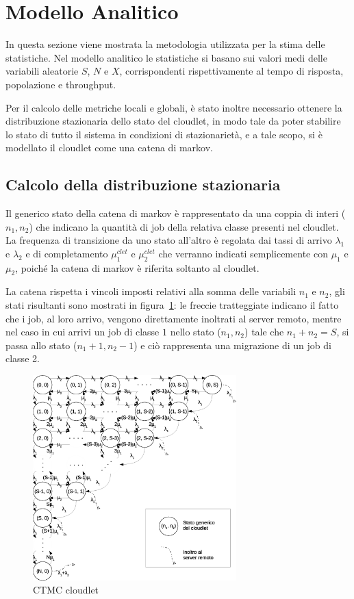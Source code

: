 \section{Modello Analitico}
In questa sezione viene mostrata la metodologia utilizzata per la stima delle
statistiche.  Nel modello analitico le statistiche si basano sui valori medi
delle variabili aleatorie $S$, $N$ e $X$, corrispondenti rispettivamente al
tempo di risposta, popolazione e throughput.

Per il calcolo delle metriche locali e globali, è stato inoltre necessario
ottenere la distribuzione stazionaria dello stato del cloudlet, in modo tale da
poter stabilire lo stato di tutto il sistema in condizioni di stazionarietà, e a
tale scopo, si è modellato il cloudlet come una catena di markov.
\subsection{Calcolo della distribuzione stazionaria}
Il generico stato della catena di markov è rappresentato da una coppia di interi
($n_1, n_2$) che indicano la quantità di job della relativa classe presenti nel
cloudlet.\\
La frequenza di transizione da uno stato all'altro è regolata dai tassi di
arrivo $\lambda_1$ e $\lambda_2$ e di completamento $\mu_1^{clet}$ e
$\mu_2^{clet}$ che verranno indicati semplicemente con $\mu_1$ e $\mu_2$, poiché
la catena di markov è riferita soltanto al cloudlet.

La catena rispetta i vincoli imposti relativi alla somma delle variabili $n_1$ e
$n_2$, gli stati risultanti sono mostrati in figura~\ref{ctmc}: le freccie
tratteggiate indicano il fatto che i job, al loro arrivo, vengono direttamente
inoltrati al server remoto, mentre nel caso in cui arrivi un job di classe $1$
nello stato ($n_1, n_2$) tale che $n_1+n_2=S$, si passa allo stato ($n_1+1,
n_2-1$) e ciò rappresenta una migrazione di un job di classe 2.
%
\begin{figure}[!h]
\centering
\includegraphics[width=0.7\textwidth]{figures/ctmc}
\caption{CTMC cloudlet}
\label{ctmc}
\end{figure}
%

